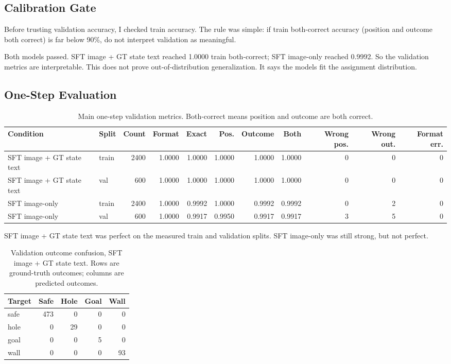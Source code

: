 \documentclass{article}
\begin{document}
\subsection{Calibration Gate}

Before trusting validation accuracy, I checked train accuracy. The rule was simple: if train both-correct accuracy (position and outcome both correct) is far below 90\%, do not interpret validation as meaningful.

Both models passed. SFT image + GT state text reached 1.0000 train both-correct; SFT image-only reached 0.9992. So the validation metrics are interpretable. This does not prove out-of-distribution generalization. It says the models fit the assignment distribution.

\subsection{One-Step Evaluation}

\begin{table}[t]
\caption{Main one-step validation metrics. Both-correct means position and outcome are both correct.}
\label{tab:a5}
\centering
\scriptsize
\begin{tabular}{llrrrrrrrrr}
\toprule
Condition & Split & Count & Format & Exact & Pos. & Outcome & Both & Wrong pos. & Wrong out. & Format err. \\
\midrule
SFT image + GT state text & train & 2400 & 1.0000 & 1.0000 & 1.0000 & 1.0000 & 1.0000 & 0 & 0 & 0 \\
SFT image + GT state text & val & 600 & 1.0000 & 1.0000 & 1.0000 & 1.0000 & 1.0000 & 0 & 0 & 0 \\
SFT image-only & train & 2400 & 1.0000 & 0.9992 & 1.0000 & 0.9992 & 0.9992 & 0 & 2 & 0 \\
SFT image-only & val & 600 & 1.0000 & 0.9917 & 0.9950 & 0.9917 & 0.9917 & 3 & 5 & 0 \\
\bottomrule
\end{tabular}
\end{table}

SFT image + GT state text was perfect on the measured train and validation splits. SFT image-only was still strong, but not perfect.

\begin{table}[t]
\caption{Validation outcome confusion, SFT image + GT state text. Rows are ground-truth outcomes; columns are predicted outcomes.}
\label{tab:conftext}
\centering
\small
\begin{tabular}{lrrrr}
\toprule
Target & Safe & Hole & Goal & Wall \\
\midrule
safe & 473 & 0 & 0 & 0 \\
hole & 0 & 29 & 0 & 0 \\
goal & 0 & 0 & 5 & 0 \\
wall & 0 & 0 & 0 & 93 \\
\bottomrule
\end{tabular}
\end{table}
\end{document}
